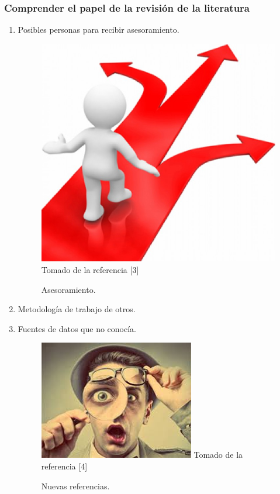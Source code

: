 \documentclass{beamer}
\newcounter{sauvegardeenumi}
\newcommand{\asuivre}{\setcounter{sauvegardeenumi}{\theenumi}}
\newcommand{\suite}{\setcounter{enumi}{\thesauvegardeenumi}}
\begin{document}
    \begin{frame}
        \frametitle{Comprender el papel de la revisi\'on de la literatura} 
        \begin{multicols}{2}
            \begin{enumerate}
                \suite
                \item Posibles personas para recibir asesoramiento.
                \begin{figure}
                    \includegraphics[scale=0.10]{figures/asesoramiento}
                    \newline
                    {\tiny Tomado de la referencia [3] }
                    \caption{ Asesoramiento. }
                \end{figure}

                \item Metodolog\'ia de trabajo de otros.
                \item Fuentes de datos que no conoc\'ia.
                    \begin{figure}
                        \includegraphics[scale=0.40]{figures/newResources}
                        \newline
                        {\tiny Tomado de la referencia [4] }
                        \caption{Nuevas referencias.}
                    \end{figure}
                    \asuivre
            \end{enumerate}
        \end{multicols}
    \end{frame}
\end{document}
